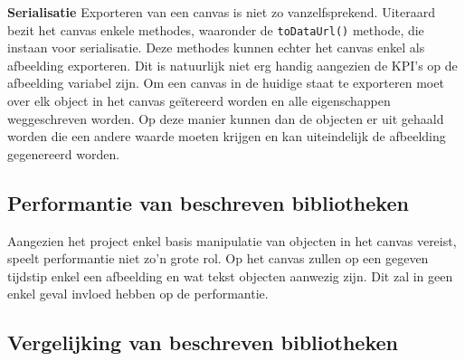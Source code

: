 \textbf{Serialisatie} \break
Exporteren van een canvas is niet zo vanzelfsprekend. Uiteraard bezit het canvas enkele methodes, waaronder de \texttt{toDataUrl()} methode, die instaan voor serialisatie. Deze methodes kunnen echter het canvas enkel als afbeelding exporteren. Dit is natuurlijk niet erg handig aangezien de KPI's op de afbeelding variabel zijn. Om een canvas in de huidige staat te exporteren moet over elk object in het canvas ge\"{i}tereerd worden en alle eigenschappen weggeschreven worden. Op deze manier kunnen dan de objecten er uit gehaald worden die een andere waarde moeten krijgen en kan uiteindelijk de afbeelding gegenereerd worden. 


\subsection{Performantie van beschreven bibliotheken}
Aangezien het project enkel basis manipulatie van objecten in het canvas vereist, speelt performantie niet zo'n grote rol. Op het canvas zullen op een gegeven tijdstip enkel een afbeelding en wat tekst objecten aanwezig zijn. Dit zal in geen enkel geval invloed hebben op de performantie. 

\subsection{Vergelijking van beschreven bibliotheken} \label{vergelijkingBibliotheken}

